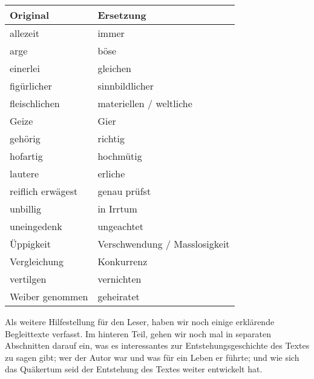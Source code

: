 \medskip

\begin{center}
\label{ref:tab_wortersetzungen}
\begin{tabular}{|l|l|} \hline
\textbf{Original}       & \textbf{Ersetzung}            \\ \hline \hline
allezeit                & immer                         \\ \hline
arge                    & böse                          \\ \hline
einerlei                & gleichen                      \\ \hline
figürlicher             & sinnbildlicher                \\ \hline
fleischlichen           & materiellen / weltliche       \\ \hline
Geize                   & Gier\\ \hline
gehörig                 & richtig                       \\ \hline
hofartig                & hochmütig                     \\ \hline
lautere                 & erliche                       \\ \hline
reiflich erwägest       & genau prüfst                  \\ \hline
unbillig                & in Irrtum                     \\ \hline
uneingedenk             & ungeachtet                    \\ \hline
Üppigkeit               & Verschwendung / Masslosigkeit          \\ \hline
Vergleichung            & Konkurrenz                     \\ \hline
vertilgen               & vernichten                    \\ \hline
Weiber genommen         & geheiratet                    \\ \hline
\end{tabular}
\end{center}
\medskip

\medskip

Als weitere Hilfestellung für den Leser, haben wir noch einige erklärende
Begleittexte verfasst. Im hinteren Teil, gehen wir noch mal in separaten
Abschnitten darauf ein, was es interessantes zur Entstehungsgeschichte des
Textes zu sagen gibt; wer der Autor war und was für ein Leben er führte; und wie
sich das Quäkertum seid der Entstehung des Textes weiter entwickelt hat.

